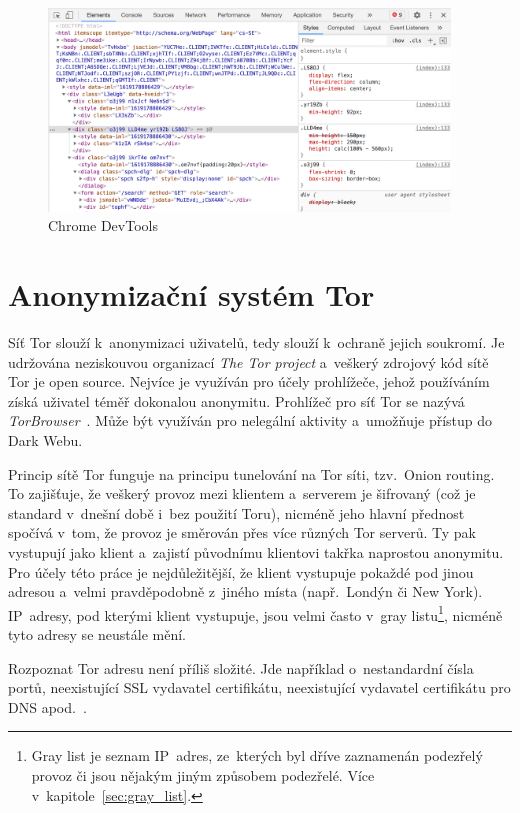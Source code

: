 \begin{figure}[hbt]
	\centering
	\includegraphics[width=0.95\textwidth]{images/chrome_devtools.jpg}
	\caption{Chrome DevTools}
	\label{img:chrome_devtools}
\end{figure}

\section{Anonymizační systém Tor}
\label{sec:tor_browser}
Síť Tor slouží k~anonymizaci uživatelů, tedy slouží k~ochraně jejich soukromí. Je udržována neziskouvou organizací \textit{The Tor project} a~veškerý zdrojový kód sítě Tor je open source. Nejvíce je využíván pro účely prohlížeče, jehož používáním získá uživatel téměř dokonalou anonymitu. Prohlížeč pro síť Tor se nazývá \textit{TorBrowser}~\cite{bib:tor_browser}. Může být využíván pro nelegální aktivity a~umožňuje přístup do Dark Webu.

Princip sítě Tor funguje na principu tunelování na Tor síti, tzv.~Onion routing. To zajišťuje, že veškerý provoz mezi klientem a~serverem je šifrovaný (což je standard v~dnešní době i~bez použití Toru), nicméně jeho hlavní přednost spočívá v~tom, že provoz je směrován přes více různých Tor serverů. Ty pak vystupují jako klient a~zajistí původnímu klientovi takřka naprostou anonymitu. Pro účely této práce je nejdůležitější, že klient vystupuje pokaždé pod jinou adresou a~velmi pravděpodobně z~jiného místa (např.~Londýn či New York). IP~adresy, pod kterými klient vystupuje, jsou velmi často v~gray listu\footnote{Gray list je seznam IP~adres, ze~kterých byl dříve zaznamenán podezřelý provoz či jsou nějakým jiným způsobem podezřelé. Více v~kapitole~\ref{sec:gray_list}.}, nicméně tyto adresy se neustále mění. 

Rozpoznat Tor adresu není příliš složité. Jde například o~nestandardní čísla portů, neexistující SSL vydavatel certifikátu, neexistující vydavatel certifikátu pro DNS apod.~\cite{bib:tor_recognition}.

